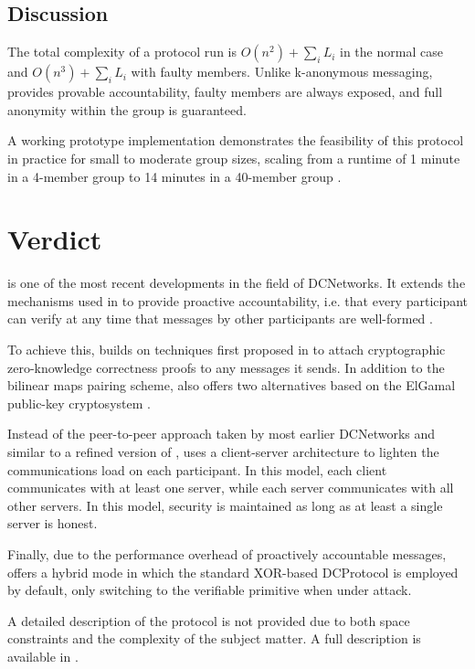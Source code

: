 \subsection{Discussion}
The total complexity of a protocol run is $O(n^2) + \sum_i L_i$ in the normal case
and $O(n^3) + \sum_i L_i$ with faulty members. Unlike k-anonymous messaging,
\Dissent provides provable accountability, faulty members are always exposed, and full anonymity
within the group is guaranteed.

A working prototype implementation demonstrates the feasibility of this protocol in practice
for small to moderate group sizes, scaling from a runtime of 1 minute in a 4-member group
to 14 minutes in a 40-member group \cite{journals/corr/abs-1004-3057}.

\section{Verdict}

\Verdict is one of the most recent developments in the field of \acp{DCNetwork}.
It extends the mechanisms used in \Dissent to provide proactive accountability, i.e.
that every participant can verify at any time that messages by other participants are well-formed \cite{corrigan2013proactively}.

To achieve this, \Verdict builds on techniques first proposed in \cite{juels2004dining}
to attach cryptographic zero-knowledge correctness proofs to any messages it sends.
In addition to the bilinear maps pairing scheme, \Verdict also offers two alternatives
based on the ElGamal public-key cryptosystem \cite{ElGamal1985}.

Instead of the peer-to-peer approach taken by most earlier \acp{DCNetwork}
and similar to a refined version of \Dissent \cite{wolinsky2012dissent},
\Verdict uses a client-server architecture to lighten the communications load
on each participant. In this model, each client communicates with at least one server,
while each server communicates with all other servers. In this model, security
is maintained as long as at least a single server is honest.

Finally, due to the performance overhead of proactively accountable messages,
\Verdict offers a hybrid mode in which the standard XOR-based \ac{DCProtocol}
is employed by default, only switching to the verifiable primitive when under attack.

A detailed description of the protocol is not provided due to both space constraints and
the complexity of the subject matter. A full description is available in \cite{corrigan2013proactively}.

